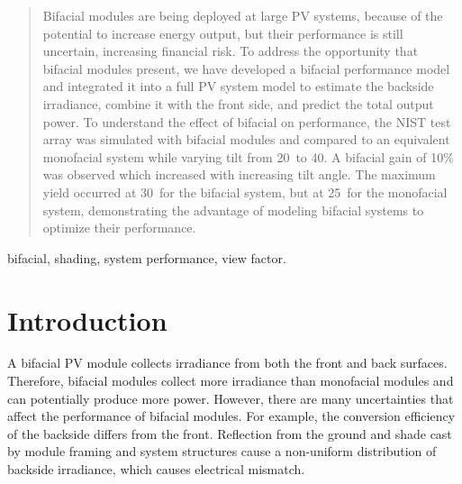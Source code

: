 \documentclass[conference]{IEEEtran}
\begin{document}
\begin{abstract}
Bifacial modules are being deployed at large PV systems, because of the potential to increase energy output, but their performance is still uncertain, increasing financial risk.  To address the opportunity that bifacial modules present, we have developed a bifacial performance model and integrated it into a full PV system model to estimate the backside irradiance, combine it with the front side, and predict the total output power.  To understand the effect of bifacial on performance, the NIST test array was simulated with bifacial modules and compared to an equivalent monofacial system while varying tilt from 20\degree\ to 40\degree.  A bifacial gain of 10\% was observed which increased with increasing tilt angle.  The maximum yield occurred at 30\degree\ for the bifacial system, but at 25\degree\ for the monofacial system, demonstrating the advantage of modeling bifacial systems to optimize their performance.
\end{abstract}
\begin{IEEEkeywords}
bifacial, shading, system performance, view factor.
\end{IEEEkeywords}




%
\IEEEpeerreviewmaketitle



\section{Introduction}
A bifacial PV module collects irradiance from both the front and back surfaces.  Therefore, bifacial modules collect more irradiance than monofacial modules and can potentially produce more power.  However, there are many uncertainties that affect the performance of bifacial modules.  For example, the conversion efficiency of the backside differs from the front.  Reflection from the ground and shade cast by module framing and system structures cause a non-uniform distribution of backside irradiance, which causes electrical mismatch.
\end{document}
